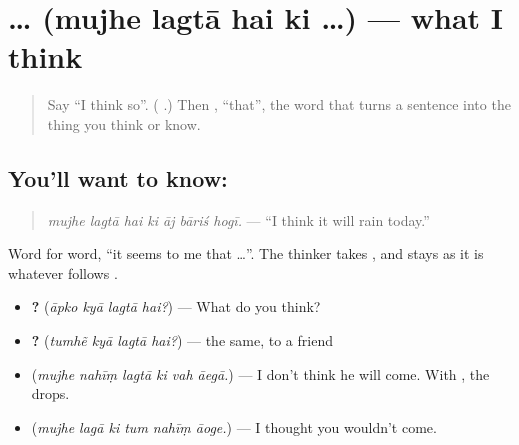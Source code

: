 \section[\texorpdfstring{\hi{मुझे} \hi{लगता} \hi{है} \hi{कि} … (mujhe lagtā hai ki …)}{मुझे लगता है कि … (mujhe lagtā hai ki …)}]{    … (mujhe lagtā hai ki …) — what I think}

\label{lesson:HI-C280-mujhelagtahai}



\begin{quote}
Say \textquotedblleft{}I think so\textquotedblright{}. (\textbf{   }.) Then \textbf{}, \textquotedblleft{}that\textquotedblright{}, the word that turns a sentence into the thing you think or know.
\end{quote}

\subsection*{You'll want to know:    }
\begin{quote}
\textbf{      }
\end{quote}

\begin{quote}
\emph{mujhe lagtā hai ki āj bāriś hogī.} — \textquotedblleft{}I think it will rain today.\textquotedblright{}
\end{quote}

Word for word, \textquotedblleft{}it seems to me that …\textquotedblright{}. The thinker takes \textbf{}, and \textbf{ } stays as it is whatever follows \textbf{}.

\begin{itemize}
\raggedright
  \item \textbf{   ?} (\emph{āpko kyā lagtā hai?}) — What do you think?
  \item \textbf{   ?} (\emph{tumhẽ kyā lagtā hai?}) — the same, to a friend
  \item \textbf{     } (\emph{mujhe nahīṃ lagtā ki vah āegā.}) — I don't think he will come. With \textbf{}, the \textbf{} drops.
  \item \textbf{     } (\emph{mujhe lagā ki tum nahīṃ āoge.}) — I thought you wouldn't come.
\end{itemize}

